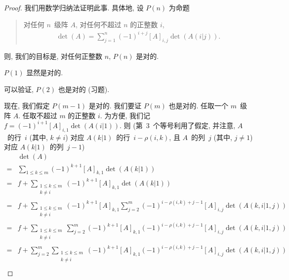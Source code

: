\documentclass[../libro.tex]{subfiles}
\begin{document}
\begin{proof}
    我们用数学归纳法证明此事.
    具体地, 设 \(P(n)\) 为命题
    \begin{quotation}
        对任何 \(n\)~级阵 \(A\),
        对任何不超过 \(n\) 的正整数 \(i\),
        \begin{align*}
            \det {(A)} = \sum_{j = 1}^{n}
            {(-1)^{i+j} [A]_{i,j} \det {(A(i|j))}}.
        \end{align*}
    \end{quotation}
    则, 我们的目标是,
    对任何正整数 \(n\), \(P(n)\) 是对的.

    \(P(1)\) 显然是对的.

    可以验证, \(P(2)\) 也是对的 (习题).

    现在, 我们假定 \(P(m-1)\) 是对的.
    我们要证 \(P(m)\) 也是对的.
    任取一个 \(m\)~级阵 \(A\).
    任取不超过 \(m\) 的正整数 \(i\).
    为方便, 我们记
    \(f = (-1)^{i+1} [A]_{i,1} \det {(A(i|1))}\).
    则
    (第~3~个等号利用了假定, %
    并注意,
    \(A\)~的行~\(i\) (其中, \(k \neq i\)) 对应
    \(A(k|1)\)~的行~\(i - \rho(i,k)\),
    且 \(A\)~的列~\(j\) (其中, \(j \neq 1\)) 对应
    \(A(k|1)\)~的列~\(j - 1\)) %
    \begin{align*}
        & \det {(A)}
        \\
        = {} &
        \sum_{1 \leq k \leq m}
        {(-1)^{k+1} [A]_{k,1} \det {(A(k|1))}}
        \\
        = {} &
        f + \sum_{\substack{1 \leq k \leq m \\ k \neq i}}
        {(-1)^{k+1} [A]_{k,1} \det {(A(k|1))}}
        \\
        = {} &
        f + \sum_{\substack{1 \leq k \leq m \\ k \neq i}}
        {(-1)^{k+1} [A]_{k,1}
            \sum_{j = 2}^{m}
            {(-1)^{i - \rho(i,k) + j - 1}
        [A]_{i,j} \det {(A(k,i|1,j))}}}
        \\
        = {} &
        f + \sum_{\substack{1 \leq k \leq m \\ k \neq i}}
        {\sum_{j = 2}^{m}
            {(-1)^{k+1} [A]_{k,1}
                (-1)^{i - \rho(i,k) + j - 1}
        [A]_{i,j} \det {(A(k,i|1,j))}}}
        \\
        = {} &
        f + \sum_{j = 2}^{m}
        {\sum_{\substack{1 \leq k \leq m \\ k \neq i}}
            {(-1)^{k+1} [A]_{k,1}
                (-1)^{i - \rho(i,k) + j - 1}
        [A]_{i,j} \det {(A(k,i|1,j))}}}
        \\

\end{align*}
\end{proof}
\end{document}
